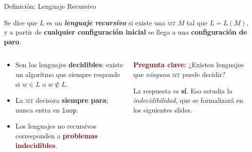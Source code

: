 \documentclass[aspectratio=1610, 12pt]{beamer}
\newcommand{\MT}{\textsc{mt}}
\begin{document}
\begin{frame}[t]{Definición: Lenguaje Recursivo}
\vspace{4pt}

\begin{center}
\begin{tcolorbox}[%
  enhanced, width=0.78\textwidth,
  colback=LightBg, colframe=NavyBlue,
  colbacktitle=NavyBlue, coltitle=white,
  fonttitle=\bfseries\normalsize,
  title={Lenguaje Recursivo},
  boxrule=1.3pt, arc=3pt,
  left=8pt, right=8pt, top=5pt, bottom=5pt,
  toptitle=3pt, bottomtitle=3pt]
  \small
  Se dice que $L$ es un \emph{\textbf{lenguaje recursivo}} si existe una \MT{} $M$ tal que
  $L = L(M)$, y a partir de \textbf{cualquier configuración inicial} se llega a
  una \textbf{configuración de paro}.
\end{tcolorbox}
\end{center}

\vspace{5pt}
\begin{columns}[T]

  \begin{column}{0.50\textwidth}
    \begin{itemize}\setlength{\itemsep}{5pt}
      \item Son los lenguajes \textcolor{MedBlue}{\textbf{decidibles}}:
        existe un algoritmo que siempre responde
        si $w \in L$ o $w \notin L$.
      \item La \MT{} decisora \textbf{siempre para};
        nunca entra en $\mathtt{loop}$.
      \item Los lenguajes no recursivos corresponden a
        \textcolor{DarkRed}{\textbf{problemas indecidibles}}.
    \end{itemize}
  \end{column}

  \begin{column}{0.46\textwidth}
    \begin{alertbox}
      \small
      \textcolor{DarkRed}{\textbf{Pregunta clave:}}
      ¿Existen lenguajes que \emph{ninguna} \MT{} puede decidir?

      \vspace{4pt}
      La respuesta es \textbf{sí}. Eso estudia la \emph{indecidibilidad},
      que se formalizará en los siguientes slides.
    \end{alertbox}
  \end{column}

\end{columns}
\end{frame}
\end{document}
